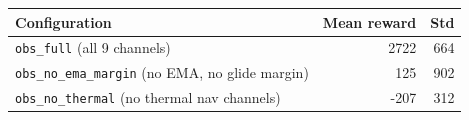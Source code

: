 \begin{tabular}{lrr}
\hline
Configuration & Mean reward & Std \\
\hline
\texttt{obs\_full} (all 9 channels) & 2722 & 664 \\
\texttt{obs\_no\_ema\_margin} (no EMA, no glide margin) & 125 & 902 \\
\texttt{obs\_no\_thermal} (no thermal nav channels) & -207 & 312 \\
\hline
\end{tabular}
